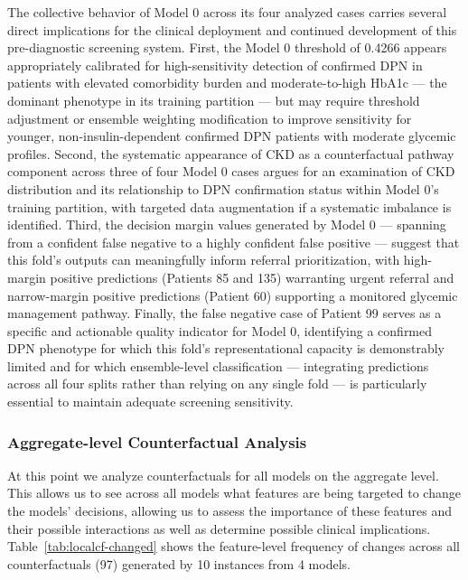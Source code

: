 \documentclass[pdflatex,sn-vancouver-num]{sn-jnl}
\begin{document}
The collective behavior of Model 0 across its four analyzed cases carries several direct implications for the clinical deployment and continued development of this pre-diagnostic screening system. First, the Model 0 threshold of 0.4266 appears appropriately calibrated for high-sensitivity detection of confirmed DPN in patients with elevated comorbidity burden and moderate-to-high HbA1c — the dominant phenotype in its training partition — but may require threshold adjustment or ensemble weighting modification to improve sensitivity for younger, non-insulin-dependent confirmed DPN patients with moderate glycemic profiles. Second, the systematic appearance of CKD as a counterfactual pathway component across three of four Model 0 cases argues for an examination of CKD distribution and its relationship to DPN confirmation status within Model 0's training partition, with targeted data augmentation if a systematic imbalance is identified. Third, the decision margin values generated by Model 0 — spanning from a confident false negative to a highly confident false positive — suggest that this fold's outputs can meaningfully inform referral prioritization, with high-margin positive predictions (Patients 85 and 135) warranting urgent referral and narrow-margin positive predictions (Patient 60) supporting a monitored glycemic management pathway. Finally, the false negative case of Patient 99 serves as a specific and actionable quality indicator for Model 0, identifying a confirmed DPN phenotype for which this fold's representational capacity is demonstrably limited and for which ensemble-level classification — integrating predictions across all four splits rather than relying on any single fold — is particularly essential to maintain adequate screening sensitivity.

\subsubsection{Aggregate-level Counterfactual Analysis}
At this point we analyze counterfactuals for all models on the aggregate level. This allows us to see across all models what features are being targeted to change the models' decisions, allowing us to assess the importance of these features and their possible interactions as well as determine possible clinical implications. Table~\ref{tab:localcf-changed} shows the feature-level frequency of changes across all counterfactuals (97) generated by 10 instances from 4 models.
\end{document}
